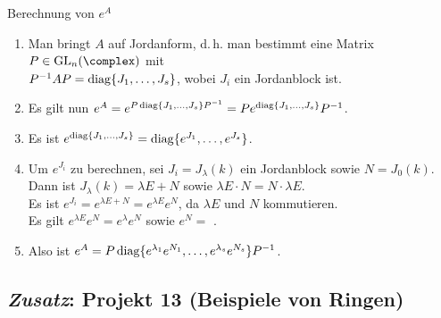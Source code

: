 \begin{Prozedur}{Berechnung von $e^A$}
    \begin{enumerate}
        \item
        Man bringt $A$ auf Jordanform, d.\,h. man bestimmt eine Matrix
        $P \in \GL_n(\complex)$ mit \\
        $P^{-1} A P = \operatorname{diag}\{J_1, \dotsc, J_s\}$,
        wobei $J_i$ ein Jordanblock ist.
        
        \item
        Es gilt nun $e^A = e^{P \operatorname{diag}\{J_1, \dotsc, J_s\} P^{-1}} =
        P e^{\operatorname{diag}\{J_1, \dotsc, J_s\}} P^{-1}$.
        
        \item
        Es ist $e^{\operatorname{diag}\{J_1, \dotsc, J_s\}} =
        \operatorname{diag}\{e^{J_1}, \dotsc, e^{J_s}\}$.
        
        \item
        Um $e^{J_i}$ zu berechnen, sei $J_i = J_\lambda(k)$ ein Jordanblock
        sowie $N = J_0(k)$. \\
        Dann ist $J_\lambda(k) = \lambda E + N$ sowie
        $\lambda E \cdot N = N \cdot \lambda E$. \\
        Es ist $e^{J_i} = e^{\lambda E + N} = e^{\lambda E} e^N$,
        da $\lambda E$ und $N$ kommutieren. \\
        Es gilt $e^{\lambda E} e^N = e^\lambda e^N$ sowie
        $e^N =$ .
        
        \item
        Also ist $e^A = P \operatorname{diag}\{e^{\lambda_1} e^{N_1}, \dotsc,
        e^{\lambda_s} e^{N_s}\} P^{-1}$.
    \end{enumerate}
\end{Prozedur}

\subsection{%
    \emph{Zusatz}: Projekt 13 (Beispiele von Ringen)%
}

